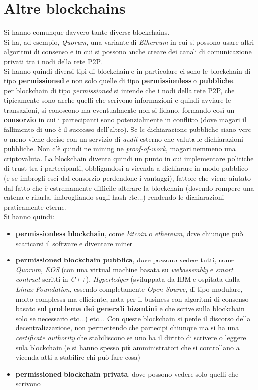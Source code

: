 \documentclass[a4paper,12pt, oneside]{book}
\begin{document}
\section{Altre blockchains}
Si hanno comunque davvero tante diverse blockchains.\\
Si ha, ad esempio, \textit{Quorum}, una variante di \textit{Ethereum} in cui si
possono usare altri algoritmi di consenso e in cui si possono anche creare dei
canali di comunicazione privati tra i nodi della rete P2P.\\
Si hanno quindi diversi tipi di blockchain e in particolare ci sono le
blockchain di tipo \textbf{permissioned} e non solo quelle di tipo
\textbf{permissionless} o \textbf{pubbliche}.\\
per blockchain di tipo \textit{permissioned} si intende che i nodi della rete
P2P, che tipicamente sono anche quelli che scrivono informazioni e quindi
avviare le transazioni, si conoscono ma eventualmente non si fidano, formando
così un \textbf{consorzio} in cui i partecipanti sono potenzialmente in
conflitto (dove magari il fallimento di uno è il successo dell'altro). Se le
dichiarazione pubbliche siano vere o meno viene deciso con un servizio di
\textit{audit} esterno che valuta le dichiarazioni pubbliche. Non c'è quindi ne
mining ne \textit{proof-of-work}, magari nemmeno una criptovaluta. La blockchain
diventa quindi un punto in cui implementare politiche di trust tra i
partecipanti, obbligandosi a vicenda a dichiarare in modo pubblico (e se
imbrogli esci dal consorzio perdendone i vantaggi), fattore che
viene aiutato dal fatto che è estremamente difficile alterare la blockchain
(dovendo rompere una catena e rifarla, imbrogliando sugli hash etc$\ldots$)
rendendo le dichiarazioni praticamente eterne.\\
Si hanno quindi:
\begin{itemize}
  \item \textbf{permissionless blockchain}, come \textit{bitcoin} o
  \textit{ethereum}, dove chiunque può scaricarsi il software e diventare miner
  \item \textbf{permissioned blockchain pubblica}, dove possono vedere tutti,
  come \textit{Quorum}, \textit{EOS} (con una virtual machine basata su
  \textit{webassembly} e \textit{smart contract} scritti in \textit{C++}),
  \textit{Hyperledger} (sviluppata da IBM e ospitata dalla \textit{Linux
    Foundation}, essendo completamente \textit{Open Source}, di tipo modulare,
  molto complessa ma efficiente, nata 
  per il business con algoritmi di consenso basato sul \textbf{problema dei
    generali bizantini} e che scrive sulla blockchain solo se necessario
  etc$\ldots$) etc$\ldots$ Con queste blockchain si perde il discorso della
  decentralizzazione, non permettendo che partecipi chiunque ma si ha una
  \textit{certificate authority} che stabiliscono se uno ha il diritto di
  scrivere o leggere sula blockchain (e si hanno spesso più amministratori che
  si controllano a vicenda atti a stabilire chi può fare cosa)  
  \item \textbf{permissioned blockchain privata}, dove possono vedere solo
  quelli che scrivono
\end{itemize}
\end{document}

